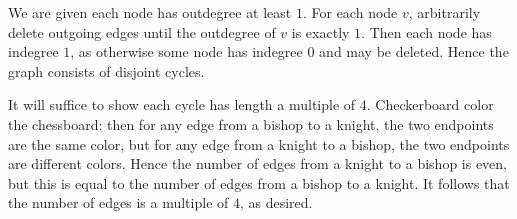 We are given each node has outdegree at least $1$. For each node $v$, arbitrarily delete outgoing edges until the outdegree of $v$ is exactly $1$. Then each node has indegree $1$, as otherwise some node has indegree $0$ and may be deleted. Hence the graph consists of disjoint cycles.

It will suffice to show each cycle has length a multiple of $4$. Checkerboard color the chessboard: then for any edge from a bishop to a knight, the two endpoints are the same color, but for any edge from a knight to a bishop, the two endpoints are different colors. Hence the number of edges from a knight to a bishop is even, but this is equal to the number of edges from a bishop to a knight. It follows that the number of edges is a multiple of $4$, as desired.


